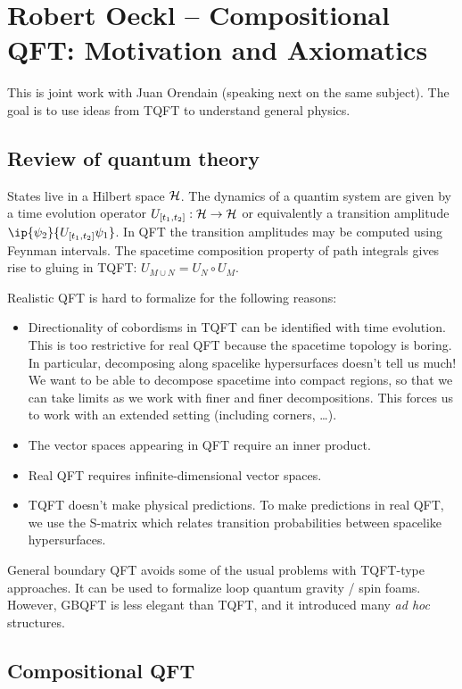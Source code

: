 \documentclass{amsart}
\begin{document}
\section{Robert Oeckl -- Compositional QFT: Motivation and Axiomatics}

This is joint work with Juan Orendain (speaking next on the same subject).
The goal is to use ideas from TQFT to understand general physics.

\subsection{Review of quantum theory}

States live in a Hilbert space $\mathcal{H}$.
The dynamics of a quantim system are given by a time evolution operator $U_{[t_1, t_2]}: \mathcal{H} \to \mathcal{H}$ or equivalently a transition amplitude $\ip{\psi_2}{U_{[t_1, t_2]} \psi_1}$.
In QFT the transition amplitudes may be computed using Feynman intervals.
The spacetime composition property of path integrals gives rise to gluing in TQFT: $U_{M \cup N} = U_N \circ U_M$.

Realistic QFT is hard to formalize for the following reasons:
\begin{itemize}
  \item Directionality of cobordisms in TQFT can be identified with time evolution.
    This is too restrictive for real QFT because the spacetime topology is boring.
    In particular, decomposing along spacelike hypersurfaces doesn't tell us much!
    We want to be able to decompose spacetime into compact regions, so that we can take limits as we work with finer and finer decompositions.
    This forces us to work with an extended setting (including corners, \dots).
  \item The vector spaces appearing in QFT require an inner product.
  \item Real QFT requires infinite-dimensional vector spaces.
  \item TQFT doesn't make physical predictions.
    To make predictions in real QFT, we use the S-matrix which relates transition probabilities between spacelike hypersurfaces.
\end{itemize}

General boundary QFT avoids some of the usual problems with TQFT-type approaches.
It can be used to formalize loop quantum gravity / spin foams.
However, GBQFT is less elegant than TQFT, and it introduced many \emph{ad hoc} structures.

\subsection{Compositional QFT}
\end{document}

